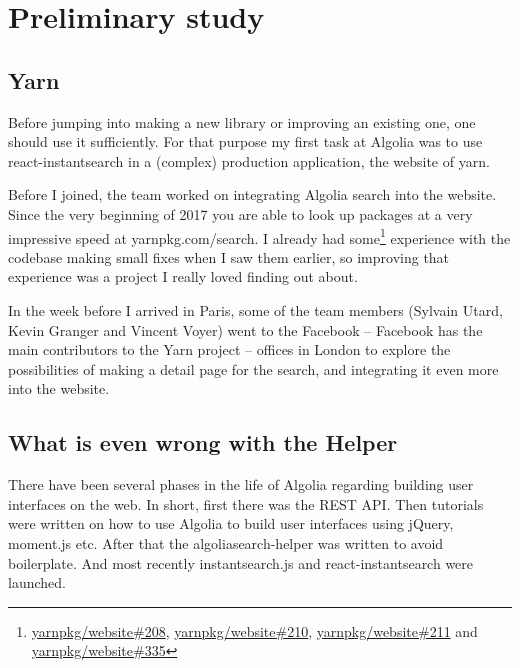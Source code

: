 
\chapter{Preliminary study} %
\section{Yarn} %
\label{chp:yarn}

Before jumping into making a new library or improving an existing one, one should use it sufficiently. For that purpose my first task at Algolia was to use react-instantsearch in a (complex) production application, the website of yarn\cite{yarn-site}.

Before I joined, the team worked on integrating Algolia search into the website\cite{yarn-pr-add-algolia}. Since the very beginning of 2017 you are able to look up packages at a very impressive speed at yarnpkg.com/search. I already had some\footnote{\href{https://github.com/yarnpkg/website/pulls/208}{yarnpkg/website\#208}, \href{https://github.com/yarnpkg/website/pulls/210}{yarnpkg/website\#210}, \href{https://github.com/yarnpkg/website/pulls211}{yarnpkg/website\#211} and \href{https://github.com/yarnpkg/website/pulls/335}{yarnpkg/website\#335}} experience with the codebase making small fixes when I saw them earlier, so improving that experience was a project I really loved finding out about.

In the week before I arrived in Paris, some of the team members (Sylvain Utard, Kevin Granger and Vincent Voyer) went to the Facebook -- Facebook has the main contributors to the Yarn project -- offices in London to explore the possibilities of making a detail page for the search, and integrating it even more into the website.

\section{What is even wrong with the Helper} %
\label{sec:what_is_even_wrong_with_the_helper}

There have been several phases in the life of Algolia regarding building user interfaces on the web. In short, first there was the REST API. Then tutorials were written on how to use Algolia to build user interfaces using jQuery, moment.js etc. After that the algoliasearch-helper\cite{algolia-helper-github} was written to avoid boilerplate. And most recently instantsearch.js\cite{instantsearch-js} and react-instantsearch\cite{react-instantsearch} were launched.

